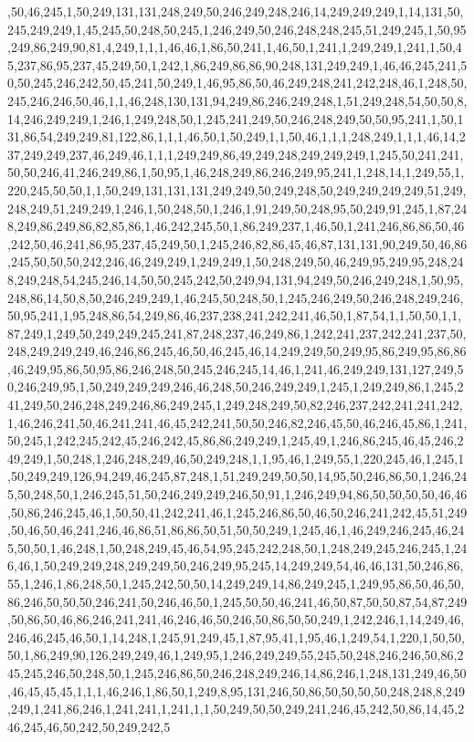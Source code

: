 ,50,46,245,1,50,249,131,131,248,249,50,246,249,248,246,14,249,249,249,1,14,131,50,245,249,249,1,45,245,50,248,50,245,1,246,249,50,246,248,248,245,51,249,245,1,50,95,249,86,249,90,81,4,249,1,1,1,46,46,1,86,50,241,1,46,50,1,241,1,249,249,1,241,1,50,45,237,86,95,237,45,249,50,1,242,1,86,249,86,86,90,248,131,249,249,1,46,46,245,241,50,50,245,246,242,50,45,241,50,249,1,46,95,86,50,46,249,248,241,242,248,46,1,248,50,245,246,246,50,46,1,1,46,248,130,131,94,249,86,246,249,248,1,51,249,248,54,50,50,8,14,246,249,249,1,246,1,249,248,50,1,245,241,249,50,246,248,249,50,50,95,241,1,50,131,86,54,249,249,81,122,86,1,1,1,46,50,1,50,249,1,1,50,46,1,1,1,248,249,1,1,1,46,14,237,249,249,237,46,249,46,1,1,1,249,249,86,49,249,248,249,249,249,1,245,50,241,241,50,50,246,41,246,249,86,1,50,95,1,46,248,249,86,246,249,95,241,1,248,14,1,249,55,1,220,245,50,50,1,1,50,249,131,131,131,249,249,50,249,248,50,249,249,249,249,51,249,248,249,51,249,249,1,246,1,50,248,50,1,246,1,91,249,50,248,95,50,249,91,245,1,87,248,249,86,249,86,82,85,86,1,46,242,245,50,1,86,249,237,1,46,50,1,241,246,86,86,50,46,242,50,46,241,86,95,237,45,249,50,1,245,246,82,86,45,46,87,131,131,90,249,50,46,86,245,50,50,50,242,246,46,249,249,1,249,249,1,50,248,249,50,46,249,95,249,95,248,248,249,248,54,245,246,14,50,50,245,242,50,249,94,131,94,249,50,246,249,248,1,50,95,248,86,14,50,8,50,246,249,249,1,46,245,50,248,50,1,245,246,249,50,246,248,249,246,50,95,241,1,95,248,86,54,249,86,46,237,238,241,242,241,46,50,1,87,54,1,1,50,50,1,1,87,249,1,249,50,249,249,245,241,87,248,237,46,249,86,1,242,241,237,242,241,237,50,248,249,249,249,46,246,86,245,46,50,46,245,46,14,249,249,50,249,95,86,249,95,86,86,46,249,95,86,50,95,86,246,248,50,245,246,245,14,46,1,241,46,249,249,131,127,249,50,246,249,95,1,50,249,249,249,246,46,248,50,246,249,249,1,245,1,249,249,86,1,245,241,249,50,246,248,249,246,86,249,245,1,249,248,249,50,82,246,237,242,241,241,242,1,46,246,241,50,46,241,241,46,45,242,241,50,50,246,82,246,45,50,46,246,45,86,1,241,50,245,1,242,245,242,45,246,242,45,86,86,249,249,1,245,49,1,246,86,245,46,45,246,249,249,1,50,248,1,246,248,249,46,50,249,248,1,1,95,46,1,249,55,1,220,245,46,1,245,1,50,249,249,126,94,249,46,245,87,248,1,51,249,249,50,50,14,95,50,246,86,50,1,246,245,50,248,50,1,246,245,51,50,246,249,249,246,50,91,1,246,249,94,86,50,50,50,50,46,46,50,86,246,245,46,1,50,50,41,242,241,46,1,245,246,86,50,46,50,246,241,242,45,51,249,50,46,50,46,241,246,46,86,51,86,86,50,51,50,50,249,1,245,46,1,46,249,246,245,46,245,50,50,1,46,248,1,50,248,249,45,46,54,95,245,242,248,50,1,248,249,245,246,245,1,246,46,1,50,249,249,248,249,249,50,246,249,95,245,14,249,249,54,46,46,131,50,246,86,55,1,246,1,86,248,50,1,245,242,50,50,14,249,249,14,86,249,245,1,249,95,86,50,46,50,86,246,50,50,50,246,241,50,246,46,50,1,245,50,50,46,241,46,50,87,50,50,87,54,87,249,50,86,50,46,86,246,241,241,46,246,46,50,246,50,86,50,50,249,1,242,246,1,14,249,46,246,46,245,46,50,1,14,248,1,245,91,249,45,1,87,95,41,1,95,46,1,249,54,1,220,1,50,50,50,1,86,249,90,126,249,249,46,1,249,95,1,246,249,249,55,245,50,248,246,246,50,86,245,245,246,50,248,50,1,245,246,86,50,246,248,249,246,14,86,246,1,248,131,249,46,50,46,45,45,45,1,1,1,46,246,1,86,50,1,249,8,95,131,246,50,86,50,50,50,50,248,248,8,249,249,1,241,86,246,1,241,241,1,241,1,1,50,249,50,50,249,241,246,45,242,50,86,14,45,246,245,46,50,242,50,249,242,5